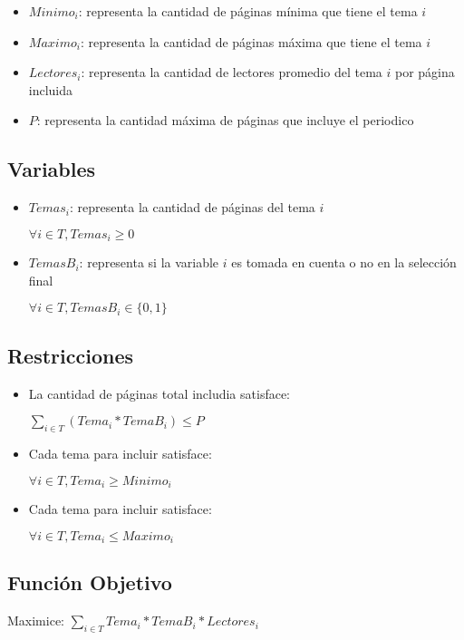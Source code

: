 \documentclass{article}
\begin{document}
\begin{itemize}
    \item $Minimo_i$: representa la cantidad de páginas mínima que tiene el tema $i$
    \item $Maximo_i$: representa la cantidad de páginas máxima que tiene el tema $i$
    \item $Lectores_i$: representa la cantidad de lectores promedio del tema $i$ por página incluida
    \item $P$: representa la cantidad máxima de páginas que incluye el periodico
\end{itemize}

\subsection{Variables}
\begin{itemize}
    \item $Temas_i$: representa la cantidad de páginas del tema $i$
    
    $\forall i \in T, Temas_i \geq 0$

    \item $TemasB_i$: representa si la variable $i$ es tomada en cuenta o no en la selección final
    
    $\forall i \in T, TemasB_i \in \{0,1\}$
\end{itemize}

\subsection{Restricciones}
\begin{itemize}
    \item La cantidad de páginas total includia satisface:
    
    $\sum_{i \in T}(Tema_i*TemaB_i) \leq P$
    
    \item Cada tema para incluir satisface:
    
    $\forall i \in T, Tema_i \geq Minimo_i$
    
    \item Cada tema para incluir satisface:
    
    $\forall i \in T, Tema_i \leq Maximo_i$
\end{itemize}

\subsection{Función Objetivo}

Maximice: $\sum_{i \in T} Tema_i * TemaB_i * Lectores_i$
\end{document}
